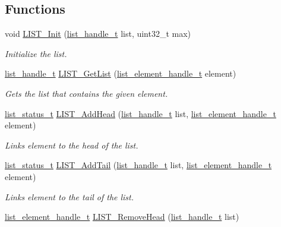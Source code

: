 \subsection*{Functions}
\begin{DoxyCompactItemize}
\item 
void \mbox{\hyperlink{group___generic_list_gab8252f6f60664cadc5a977fb3c0c4bdc}{L\+I\+S\+T\+\_\+\+Init}} (\mbox{\hyperlink{structlist__label}{list\+\_\+handle\+\_\+t}} list, uint32\+\_\+t max)
\begin{DoxyCompactList}\small\item\em Initialize the list. \end{DoxyCompactList}\item 
\mbox{\hyperlink{structlist__label}{list\+\_\+handle\+\_\+t}} \mbox{\hyperlink{group___generic_list_gac2821270f5b05d6e5a492dca3b7a5a07}{L\+I\+S\+T\+\_\+\+Get\+List}} (\mbox{\hyperlink{structlist__element__tag}{list\+\_\+element\+\_\+handle\+\_\+t}} element)
\begin{DoxyCompactList}\small\item\em Gets the list that contains the given element. \end{DoxyCompactList}\item 
\mbox{\hyperlink{group___generic_list_gaae3dc4a15b24287b8c3ac8706195aa7e}{list\+\_\+status\+\_\+t}} \mbox{\hyperlink{group___generic_list_ga4c491e8a89ae3322086cb414242c7f3f}{L\+I\+S\+T\+\_\+\+Add\+Head}} (\mbox{\hyperlink{structlist__label}{list\+\_\+handle\+\_\+t}} list, \mbox{\hyperlink{structlist__element__tag}{list\+\_\+element\+\_\+handle\+\_\+t}} element)
\begin{DoxyCompactList}\small\item\em Links element to the head of the list. \end{DoxyCompactList}\item 
\mbox{\hyperlink{group___generic_list_gaae3dc4a15b24287b8c3ac8706195aa7e}{list\+\_\+status\+\_\+t}} \mbox{\hyperlink{group___generic_list_ga06283836b30da75730f755ea4be30b93}{L\+I\+S\+T\+\_\+\+Add\+Tail}} (\mbox{\hyperlink{structlist__label}{list\+\_\+handle\+\_\+t}} list, \mbox{\hyperlink{structlist__element__tag}{list\+\_\+element\+\_\+handle\+\_\+t}} element)
\begin{DoxyCompactList}\small\item\em Links element to the tail of the list. \end{DoxyCompactList}\item 
\mbox{\hyperlink{structlist__element__tag}{list\+\_\+element\+\_\+handle\+\_\+t}} \mbox{\hyperlink{group___generic_list_gafdc7a7cdb706ad205fbbc308b91d1e73}{L\+I\+S\+T\+\_\+\+Remove\+Head}} (\mbox{\hyperlink{structlist__label}{list\+\_\+handle\+\_\+t}} list)

\end{DoxyCompactItemize}

